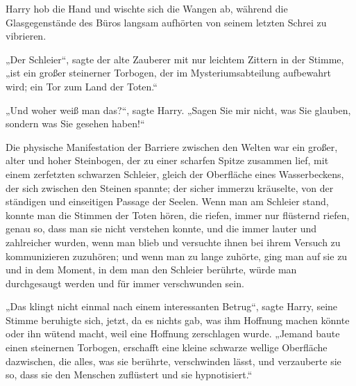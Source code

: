 Harry hob die Hand und wischte sich die Wangen ab, während die Glasgegenstände des Büros langsam aufhörten von seinem letzten Schrei zu vibrieren.

„Der Schleier“, sagte der alte Zauberer mit nur leichtem Zittern in der Stimme, „ist ein großer steinerner Torbogen, der im Mysteriumsabteilung aufbewahrt wird; ein Tor zum Land der Toten.“

„Und woher weiß man das?“, sagte Harry. „Sagen Sie mir nicht, was Sie glauben, sondern was Sie gesehen haben!“

Die physische Manifestation der Barriere zwischen den Welten war ein großer, alter und hoher Steinbogen, der zu einer scharfen Spitze zusammen lief, mit einem zerfetzten schwarzen Schleier, gleich der Oberfläche eines Wasserbeckens, der sich zwischen den Steinen spannte; der sicher immerzu kräuselte, von der ständigen und einseitigen Passage der Seelen. Wenn man am Schleier stand, konnte man die Stimmen der Toten hören, die riefen, immer nur flüsternd riefen, genau so, dass man sie nicht verstehen konnte, und die immer lauter und zahlreicher wurden, wenn man blieb und versuchte ihnen bei ihrem Versuch zu kommunizieren zuzuhören; und wenn man zu lange zuhörte, ging man auf sie zu und in dem Moment, in dem man den Schleier berührte, würde man durchgesaugt werden und für immer verschwunden sein.

„Das klingt nicht einmal nach einem interessanten Betrug“, sagte Harry, seine Stimme beruhigte sich, jetzt, da es nichts gab, was ihm Hoffnung machen könnte oder ihn wütend macht, weil eine Hoffnung zerschlagen wurde. „Jemand baute einen steinernen Torbogen, erschafft eine kleine schwarze wellige Oberfläche dazwischen, die alles, was sie berührte, verschwinden lässt, und verzauberte sie so, dass sie den Menschen zuflüstert und sie hypnotisiert.“

